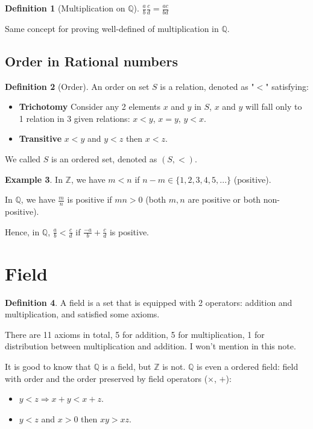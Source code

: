 \documentclass[12pt]{article}
\newcommand{\ZZ}{\mathbb{Z}}   %
\newcommand{\QQ}{\mathbb{Q}}   %
\theoremstyle{definition}
\newtheorem{definition}{Definition}[section]
\newtheorem{example}[definition]{Example}
\theoremstyle{plain}
\begin{document}
\begin{definition}[Multiplication on $\QQ$]
$\frac{a}{b} \frac{c}{d} = \frac{ac}{bd}$
\end{definition}

\begin{note}
Same concept for proving well-defined of multiplication in $\QQ$.
\end{note}

\subsection{Order in Rational numbers}
\begin{definition}[Order]
An order on set $S$ is a relation, denoted as "$<$" satisfying:
\begin{itemize}
    \item \textbf{Trichotomy} Consider any 2 elements $x$ and $y$ in $S$, $x$ and $y$ will fall only to 1 relation in 3 given relations: $x <y$, $x=y$, $y<x$.
    \item \textbf{Transitive} $x<y$ and $y<z$ then $x<z$.
\end{itemize}
We called $S$ is an ordered set, denoted as $(S, <)$.
\end{definition}

\begin{example}
In $\ZZ$, we have $m<n$ if $n-m \in \{1,2,3,4,5,...\}$ (positive).

In $\QQ$, we have $\frac{m}{n}$ is positive if $mn > 0$ (both $m,n$ are positive or both non-positive).

Hence, in $\QQ$, $\frac{a}{b}<\frac{c}{d}$ if $\frac{-a}{b}+\frac{c}{d}$ is positive.
\end{example}

\section{Field}
\begin{definition}
A field is a set that is equipped with 2 operators: addition and multiplication, and satisfied some axioms.
\end{definition}

\begin{note}
There are 11 axioms in total, 5 for addition, 5 for multiplication, 1 for distribution between multiplication and addition. I won't mention in this note.
\end{note}

\begin{note}
It is good to know that $\QQ$ is a field, but $\ZZ$ is not. $\QQ$ is even a ordered field: field with order and the order preserved by field operators ($\times$, $+$):
\begin{itemize}
    \item $y<z \Rightarrow x+y<x+z$.
    \item $y<z$ and $x>0$ then $xy>xz$.
\end{itemize}
\end{note}
\end{document}
